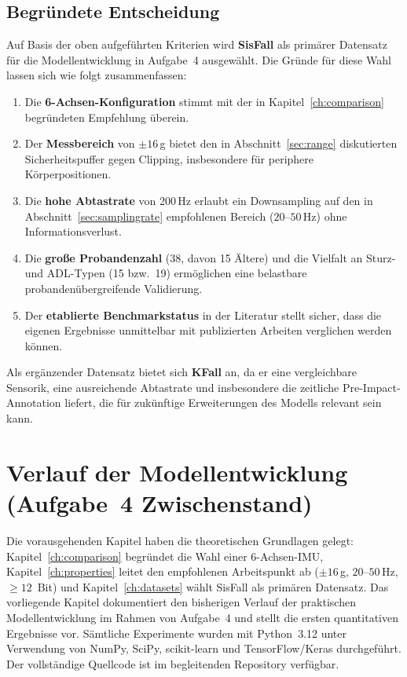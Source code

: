\documentclass[11pt,a4paper,oneside]{report}
\begin{document}
\section{Begründete Entscheidung}
\label{sec:dataset_decision}

Auf Basis der oben aufgeführten Kriterien wird \textbf{SisFall} als
primärer Datensatz für die Modellentwicklung in Aufgabe~4 ausgewählt.
Die Gründe für diese Wahl lassen sich wie folgt zusammenfassen:

\begin{enumerate}
\item Die \textbf{6-Achsen-Konfiguration} stimmt mit der in
      Kapitel~\ref{ch:comparison} begründeten Empfehlung überein.
\item Der \textbf{Messbereich} von $\pm 16$\,g bietet den in
      Abschnitt~\ref{sec:range} diskutierten Sicherheitspuffer gegen
      Clipping, insbesondere für periphere Körperpositionen.
\item Die \textbf{hohe Abtastrate} von 200\,Hz erlaubt ein Downsampling auf
      den in Abschnitt~\ref{sec:samplingrate} empfohlenen Bereich
      ($20$--$50$\,Hz) ohne Informationsverlust.
\item Die \textbf{große Probandenzahl} (38, davon 15 Ältere) und die
      Vielfalt an Sturz- und ADL-Typen (15 bzw.\ 19) ermöglichen eine
      belastbare probandenübergreifende Validierung.
\item Der \textbf{etablierte Benchmarkstatus} in der Literatur stellt sicher,
      dass die eigenen Ergebnisse unmittelbar mit publizierten Arbeiten
      verglichen werden können.
\end{enumerate}

Als ergänzender Datensatz bietet sich \textbf{KFall} an, da er eine
vergleichbare Sensorik, eine ausreichende Abtastrate und insbesondere die
zeitliche Pre-Impact-Annotation liefert, die für zukünftige Erweiterungen
des Modells relevant sein kann.

\chapter{Verlauf der Modellentwicklung (Aufgabe~4 Zwischenstand)}
\label{ch:verlauf}

Die vorausgehenden Kapitel haben die theoretischen Grundlagen gelegt:
Kapitel~\ref{ch:comparison} begründet die Wahl einer 6-Achsen-IMU,
Kapitel~\ref{ch:properties} leitet den empfohlenen Arbeitspunkt ab
($\pm 16$\,g, $20$--$50$\,Hz, $\geq 12$~Bit) und
Kapitel~\ref{ch:datasets} wählt SisFall als primären Datensatz.
Das vorliegende Kapitel dokumentiert den bisherigen Verlauf der
praktischen Modellentwicklung im Rahmen von Aufgabe~4 und stellt die
ersten quantitativen Ergebnisse vor. Sämtliche Experimente wurden mit
Python~3.12 unter Verwendung von NumPy, SciPy, scikit-learn und
TensorFlow/Keras durchgeführt. Der vollständige Quellcode ist im
begleitenden Repository verfügbar.
\end{document}
